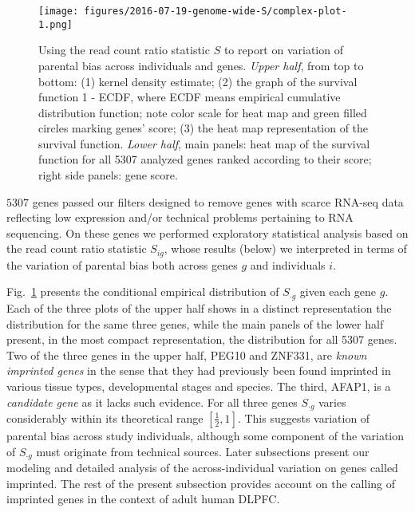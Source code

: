 \documentclass[letterpaper]{article}
\begin{document}
\begin{figure}
\begin{center}
\texttt{[image: figures/2016-07-19-genome-wide-S/complex-plot-1.png]}
\end{center}
\caption{
Using the read count ratio statistic \(S\) to report on variation of parental
bias across individuals and genes.  \emph{Upper half}, from top to bottom: (1)
kernel density estimate; (2) the graph of the survival function 1 - ECDF,
where ECDF means empirical cumulative distribution function; note color scale
for heat map and green filled circles marking genes' score; (3) the heat map
representation of the survival function.  \emph{Lower half}, main panels: heat
map of the survival function for all 5307 analyzed genes ranked according to
their score; right side panels: gene score.
}
\label{fig:ranking-genes}
\end{figure}

\(5307\) genes passed our filters designed to remove genes with scarce
RNA-seq data reflecting low expression and/or technical problems pertaining to
RNA sequencing.  On these genes we performed exploratory statistical analysis based
on the read count ratio statistic \(S_{ig}\), whose results (below) we
interpreted in terms of the variation of parental bias both across genes \(g\)
and individuals \(i\).

Fig.~\ref{fig:ranking-genes} presents the conditional empirical distribution
of \(S_{\cdot g}\) given each gene \(g\).  Each of the three plots of the
upper half shows in a distinct representation the distribution for the same
three genes, while the main panels of the lower half present, in the most
compact representation, the distribution for all 5307 genes.  Two of the three
genes in the upper half, PEG10 and ZNF331, are \emph{known imprinted genes} in
the sense that they had previously been found imprinted in various tissue
types, developmental stages and species.  The third, AFAP1, is a
\emph{candidate gene} as it lacks such evidence.  For all three genes
\(S_{\cdot g}\) varies considerably within its theoretical range
\([\frac{1}{2}, 1]\).  This suggests variation of parental bias across study
individuals, although some component of the variation of \(S_{\cdot g}\) must
originate from technical sources.  Later subsections present our modeling and
detailed analysis of the across-individual variation on genes called
imprinted.  The rest of the present subsection provides account on the calling
of imprinted genes in the context of adult human DLPFC.
\end{document}
